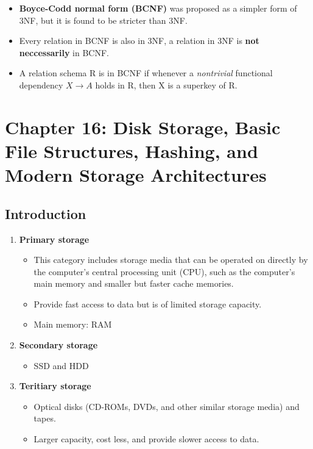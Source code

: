 \documentclass[10pt]{article}
\newcommand{\tf}{\textbf}
\newcommand{\ti}{\textit}
\newcommand{\rarrow}{\rightarrow}
\begin{document}
\begin{itemize}
	\item \tf{Boyce-Codd normal form (BCNF)} was proposed as a simpler form of 3NF, but it is found to be stricter than 3NF.
	\item Every relation in BCNF is also in 3NF, a relation in 3NF is \tf{not neccessarily} in BCNF.
	\item A relation schema R is in BCNF if whenever a \ti{nontrivial} functional dependency $X \rarrow A$ holds in R, then X is a superkey of R.
\end{itemize}

\newpage
\section{Chapter 16: Disk Storage, Basic File Structures, Hashing, and Modern Storage Architectures}

\subsection{Introduction}

\begin{enumerate}
	\item \tf{Primary storage}
	\begin{itemize}
		\item This category includes storage media that can be operated on directly by the computer's central processing unit (CPU), such as the computer's main memory and smaller but faster cache memories.
		\item Provide fast access to data but is of limited storage capacity.
		\item Main memory: RAM
	\end{itemize}

	\item \tf{Secondary storage}
	\begin{itemize}
		\item SSD and HDD
	\end{itemize}

	\item \tf{Teritiary storage}
	\begin{itemize}
		\item Optical disks (CD-ROMs, DVDs, and other similar storage media) and tapes.
		\item Larger capacity, cost less, and provide slower access to data.
	\end{itemize}
\end{enumerate}
\end{document}
